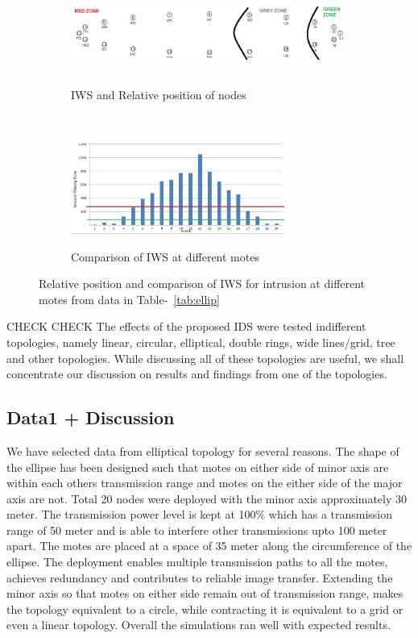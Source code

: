 \documentclass[conference,final]{IEEEtran}
\begin{document}
\begin{figure}[t!]
\label{fig:ellip}
    \centering
    \begin{subfigure}[b]{0.5\textwidth}
        \centering
        \includegraphics[height=1in, width=4in]{Elliptical}
        \label{subfig:elliptopo}
        \caption{IWS and Relative position of nodes}
    \end{subfigure}%
    ~ 
    \begin{subfigure}[b]{0.5\textwidth}
        \centering
        \includegraphics[height=1.2in]{Elliptical_column}
        \label{subfig:ellipgraph}
        \caption{Comparison of IWS at different motes}
    \end{subfigure}
    \caption{Relative position and comparison of IWS for intrusion at different motes from data in Table-~\ref{tab:ellip}}
\end{figure}


CHECK CHECK The effects of the proposed IDS were tested indifferent topologies, namely linear, circular, elliptical, double rings, wide lines/grid, tree and other topologies.
While discussing all of these topologies are useful, we shall concentrate our discussion on results and findings from one of the topologies.

\subsection{Data1 + Discussion}

We have selected data from elliptical topology for several reasons.
The shape of the ellipse has been designed such that motes on either side of minor axis are within each others transmission range and motes on the either side of the major axis are not.
Total 20 nodes were deployed with the minor axis approximately 30 meter.
The transmission power level is kept at 100\% which has a  transmission range of 50 meter and is able to interfere other transmissions upto 100 meter apart.
The motes are placed at a space of 35 meter along the circumference of the ellipse. 
The deployment enables multiple transmission paths to all the motes, achieves redundancy and contributes to reliable image transfer. 
Extending the minor axis so that motes on either side remain out of transmission range, makes the topology equivalent to a circle, while contracting it is equivalent to a grid or even a linear topology.
Overall the simulations ran well with expected results.
\end{document}
